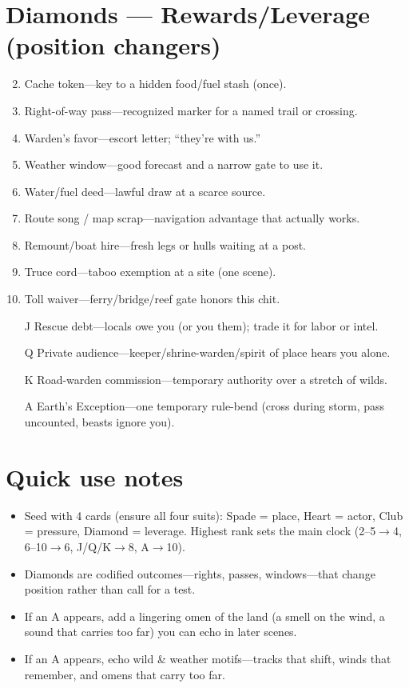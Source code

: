 \section*{Diamonds --- Rewards/Leverage (position changers)}
\label{sec:wilderness-rewards}
\begin{enumerate}
\setcounter{enumi}{1}
\item Cache token---key to a hidden food/fuel stash (once).
\item Right-of-way pass---recognized marker for a named trail or crossing.
\item Warden's favor---escort letter; ``they're with us.''
\item Weather window---good forecast and a narrow gate to use it.
\item Water/fuel deed---lawful draw at a scarce source.
\item Route song / map scrap---navigation advantage that actually works.
\item Remount/boat hire---fresh legs or hulls waiting at a post.
\item Truce cord---taboo exemption at a site (one scene).
\item Toll waiver---ferry/bridge/reef gate honors this chit.
\item[J] Rescue debt---locals owe you (or you them); trade it for labor or intel.
\item[Q] Private audience---keeper/shrine-warden/spirit of place hears you alone.
\item[K] Road-warden commission---temporary authority over a stretch of wilds.
\item[A] Earth's Exception---one temporary rule-bend (cross during storm, pass uncounted, beasts ignore you).
\end{enumerate}

\section*{Quick use notes}
\label{sec:wilderness-quick-use}
\begin{itemize}
\item Seed with 4 cards (ensure all four suits): Spade = place, Heart = actor, Club = pressure, Diamond = leverage. Highest rank sets the main clock (2--5$\rightarrow$4, 6--10$\rightarrow$6, J/Q/K$\rightarrow$8, A$\rightarrow$10).
\item Diamonds are codified outcomes---rights, passes, windows---that change position rather than call for a test.
\item If an A appears, add a lingering omen of the land (a smell on the wind, a sound that carries too far) you can echo in later scenes.
\item If an A appears, echo wild \& weather motifs---tracks that shift, winds that remember, and omens that carry too far.
\end{itemize}

